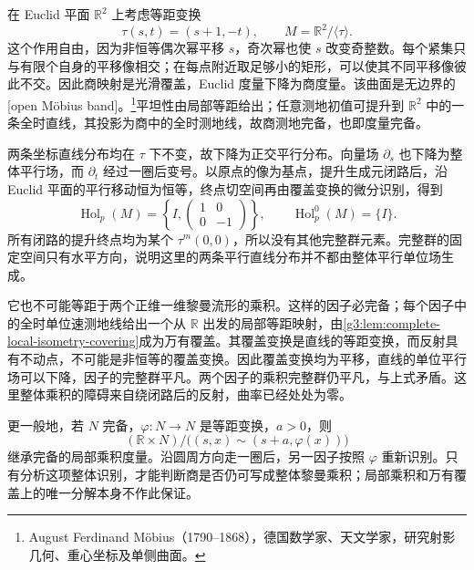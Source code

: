 \begin{example}\label{g3:exm:flat-mobius-holonomy}
	在 Euclid 平面 \(\mathbb R^2\) 上考虑等距变换
	\[
		\tau(s,t)=(s+1,-t),\qquad
		M=\mathbb R^2/\langle\tau\rangle.
	\]
	这个作用自由，因为非恒等偶次幂平移 \(s\)，奇次幂也使 \(s\) 改变奇整数。每个紧集只与有限个自身的平移像相交；在每点附近取足够小的矩形，可以使其不同平移像彼此不交。因此商映射是光滑覆盖，Euclid 度量下降为商度量。该曲面是无边界的[open Möbius band]。\footnote{August Ferdinand Möbius（1790--1868），德国数学家、天文学家，研究射影几何、重心坐标及单侧曲面。}平坦性由局部等距给出；任意测地初值可提升到 \(\mathbb R^2\) 中的一条全时直线，其投影为商中的全时测地线，故商测地完备，也即度量完备。

	两条坐标直线分布均在 \(\tau\) 下不变，故下降为正交平行分布。向量场 \(\partial_s\) 也下降为整体平行场，而 \(\partial_t\) 经过一圈后变号。以原点的像为基点，提升生成元闭路后，沿 Euclid 平面的平行移动恒为恒等，终点切空间再由覆盖变换的微分识别，得到
	\[
		\operatorname{Hol}_p(M)
		=\left\{
			I,\begin{pmatrix}1&0\\0&-1\end{pmatrix}
		\right\},
		\qquad
		\operatorname{Hol}_p^0(M)=\{I\}.
	\]
	所有闭路的提升终点均为某个 \(\tau^m(0,0)\)，所以没有其他完整群元素。完整群的固定空间只有水平方向，说明这里的两条平行直线分布并不都由整体平行单位场生成。

	它也不可能等距于两个正维一维黎曼流形的乘积。这样的因子必完备；每个因子中的全时单位速测地线给出一个从 \(\mathbb R\) 出发的局部等距映射，由\cref{g3:lem:complete-local-isometry-covering}成为万有覆盖。其覆盖变换是直线的等距变换，而反射具有不动点，不可能是非恒等的覆盖变换。因此覆盖变换均为平移，直线的单位平行场可以下降，因子的完整群平凡。两个因子的乘积完整群仍平凡，与上式矛盾。这里整体乘积的障碍来自绕闭路后的反射，曲率已经处处为零。
\end{example}

更一般地，若 \(N\) 完备，\(\varphi:N\to N\) 是等距变换，\(a>0\)，则
\[
	(\mathbb R\times N)/\bigl((s,x)\sim(s+a,\varphi(x))\bigr)
\]
继承完备的局部乘积度量。沿圆周方向走一圈后，另一因子按照 \(\varphi\) 重新识别。只有分析这项整体识别，才能判断商是否仍可写成整体黎曼乘积；局部乘积和万有覆盖上的唯一分解本身不作此保证。
